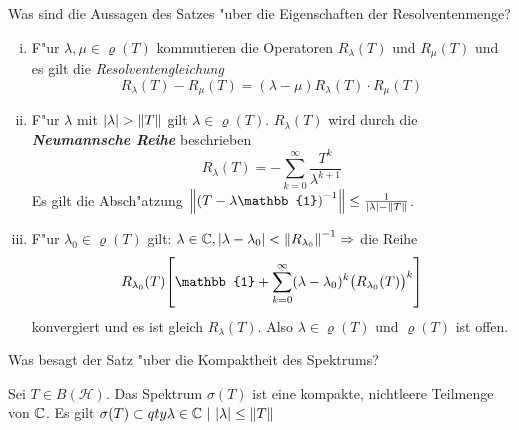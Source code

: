 \documentclass[9pt]{article}
\newcommand{\C}[1]{%
	\ifthenelse{\equal{#1}{}}
	{\mathbb{C}}
	{\mathbb{C}^{#1}}}%
\newcommand{\Hi}{\mathcal{H}}
\newcommand{\id}{\mathbb{1}}
\newcommand{\inv}{^{-1}}
\newenvironment{field}{}{\newpage}
\newif\ifnote
\newenvironment{note}{\notetrue}{\notefalse}
\newcommand{\localtag}{}
\newcommand{\globaltag}{}
\newcommand{\uuid}{}
\newcommand{\tags}[1]{
    \ifnote 
        \renewcommand{\localtag}{#1}
    \else
        \renewcommand{\globaltag}{#1}
    \fi 
    }
\newcommand{\xplain}[1]{\renewcommand{\uuid}{#1}}
\begin{document}
	\begin{note}
		\xplain{03cf9f0b-a62c-447a-97f2-bd6fe8a534e7}
		\tags{6.3.3 Resolventenmenge}
		
		\begin{field}  %
			Was sind die Aussagen des Satzes "uber die Eigenschaften der Resolventenmenge?
		\end{field}
		
		\begin{field}  %
			\footnotesize
			\begin{enumerate}[i)]
				\item F"ur $ \lambda, \mu \in \varrho(T)$ kommutieren die Operatoren $R_\lambda(T)$ und $R_\mu(T)$ und es gilt die \textit{Resolventengleichung}
				\begin{equation*}
					R_\lambda(T) - R_\mu(T) = (\lambda - \mu)R_\lambda(T) \cdot R_\mu(T)
				\end{equation*}
				\item F"ur $\lambda$ mit $\abs{\lambda} > \norm{T}$ gilt $\lambda \in \varrho(T)$. $R_\lambda(T)$ wird durch die
				\textbf{\textit{Neumannsche Reihe}} beschrieben
				\begin{equation*}
					R_\lambda(T) = - \sum^\infty_{k=0} \frac{T^k}{\lambda^{k+1}}
				\end{equation*}
				Es gilt die Absch"atzung $\norm{\qty(T-\lambda\id)\inv} \leq \frac{1}{\abs{\lambda} - \norm{T}}$.
				\item F"ur $\lambda_0 \in \varrho(T)$ gilt: $\lambda \in \C{}, \abs{\lambda - \lambda_0}<\norm{R_{\lambda_0}}\inv \Rightarrow$ die Reihe
				\begin{equation*}
					R_{\lambda_0}(T) \qty[\id + \sum^\infty_{k=0}(\lambda - \lambda_0)^k \qty(R_{\lambda_0}(T))^k]
				\end{equation*}
				konvergiert und es ist gleich $R_\lambda(T)$. 	Also $\lambda \in \varrho(T)$ und $\varrho(T)$ ist offen.
			\end{enumerate}
		\end{field}
	\end{note}
	\begin{note}
		\xplain{bb06deb4-96be-4cad-ac9f-d46551679abd}
		\tags{6.3.4}
		
		\begin{field}  %
			Was besagt der Satz "uber die Kompaktheit des Spektrums?
		\end{field}
		
		\begin{field}  %
			Sei $T\in B(\Hi)$. Das Spektrum $\sigma(T)$ ist eine kompakte, nichtleere Teilmenge von $\C{}$. Es gilt
			$\sigma(T) \subset 
			qty{\lambda \in \C{} \ | \ \abs{\lambda} \leq \norm{T}}$
		\end{field}
	\end{note}
\end{document}
